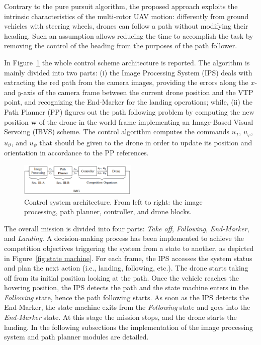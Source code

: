 \documentclass[a4paper,twocolumn,10pt]{article}
\begin{document}
    Contrary to the pure pursuit algorithm, the proposed approach exploits the intrinsic 
    characteristics of the multi-rotor UAV motion: differently from ground vehicles with steering 
    wheels, drones can follow a path without modifying their heading. Such an assumption allows 
    reducing the time to accomplish the task by removing the control of the heading from the purposes 
    of the path follower.

    In Figure~\ref{fig:block diagram} the whole control scheme architecture is reported. The algorithm 
    is mainly divided into two parts: (i) the Image Processing System (IPS) deals with extracting the red path from the 
    camera images, providing the errors along the $x$- and $y$-axis of the camera frame between the 
    current drone position and the VTP point, and recognizing the End-Marker for the landing 
    operations; while, (ii) the Path Planner (PP) figures out the path following problem by computing the new 
    position $\mathbf{w}$ of the drone in the world frame\cite[Sec.~V]{SilanoMATFly} implementing 
    an Image-Based Visual Servoing (IBVS) scheme. The control algorithm computes the commands $u_T$, $u_\varphi$, 
    $u_\vartheta$, and $u_\psi$ that should be given to the drone in order to update its position and 
    orientation in accordance to the PP references. 

    \begin{figure}
        \centering
        \includegraphics[width=0.5\textwidth]{pics/fig4_frick.png}
        \caption{Control system architecture. From left to right: the image processing, path planner, 
        controller, and drone blocks.}
        \label{fig:block diagram}
    \end{figure}

    The overall mission is divided into four parts: \textit{Take off}, \textit{Following}, 
    \textit{End-Marker}, and \textit{Landing}. A decision-making process has been implemented to 
    achieve the competition objectives triggering the system from a state to another, as depicted in 
    Figure~\ref{fig:state machine}. For each frame, the IPS accesses the system status and plan 
    the next action (i.e., landing, following, etc.). The drone starts taking off from its initial 
    position looking at the path. Once the vehicle reaches the hovering position, the IPS detects 
    the path and the state machine enters in the \textit{Following} state, hence the path following 
    starts. As soon as the IPS detects the End-Marker, the state machine exits from the 
    \textit{Following} state and goes into the \textit{End-Marker} state. At this stage the mission 
    stops, and the drone starts the landing. In the following subsections the implementation of the 
    image processing system and path planner modules are detailed.
\end{document}
